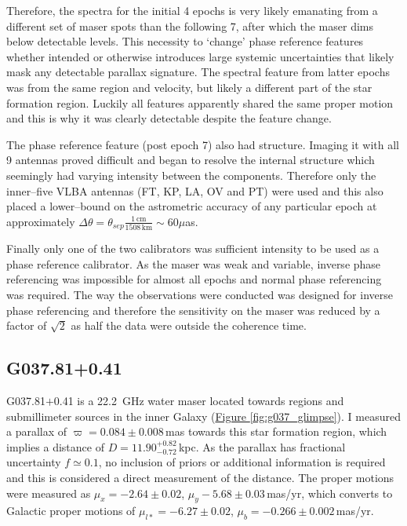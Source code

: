             Therefore, the spectra for the initial 4 epochs is very likely emanating from a different set of maser spots than the following 7, after which the maser dims below detectable levels. This necessity to `change' phase reference features whether intended or otherwise introduces large systemic uncertainties that likely mask any detectable parallax signature. The spectral feature from latter epochs was from the same region and velocity, but likely a different part of the star formation region. Luckily all features apparently shared the same proper motion and this is why it was clearly detectable despite the feature change.
            
            The phase reference feature (post epoch 7) also had structure. Imaging it with all 9 antennas proved difficult and began to resolve the internal structure which seemingly had varying intensity between the components. Therefore only the inner--five VLBA antennas (FT, KP, LA, OV and PT) were used and this also placed a lower--bound on the astrometric accuracy of any particular epoch at approximately $\Delta\theta=\theta_{sep}\frac{1\,\text{cm}}{1508\,\text{km}}\sim60\mu$as.

			Finally only one of the two calibrators was sufficient intensity to be used as a phase reference calibrator. As the maser was weak and variable, inverse phase referencing was impossible for almost all epochs and normal phase referencing was required. The  way the observations were conducted was designed for inverse phase referencing and therefore the sensitivity on the maser was reduced by a factor of $\sqrt{2}$ as half the data were outside the coherence time.

       	\subsection{G037.81+0.41}
	       	G037.81$+$0.41 is a 22.2~GHz water maser located towards \hii\space regions and submillimeter sources in the inner Galaxy (\hyperref[fig:g037_glimpse]{Figure \ref*{fig:g037_glimpse}}). I measured a parallax of $\varpi=0.084\pm0.008$\,mas towards this star formation region, which implies a distance of $D=11.90^{+0.82}_{-0.72}$\,kpc. As the parallax has fractional uncertainty $f\simeq0.1$, no inclusion of priors or additional information is required and this is considered a direct measurement of the distance. The proper motions were measured as $\mu_x  =-2.64\pm0.02$, $\mu_y-5.68 \pm0.03$\,mas/yr, which converts to Galactic proper motions of $\mu_{l*}=-6.27\pm0.02$, $\mu_b=-0.266\pm0.002$\,mas/yr.
	       	
